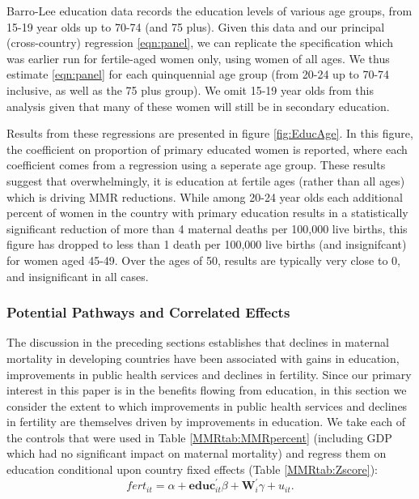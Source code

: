 \documentclass{article}[12pt,subeqn]
\begin{document}
\begin{spacing}{1.4}
Barro-Lee education data records the education levels of various age groups,
from 15-19 year olds up to 70-74 (and 75 plus).  Given this data and our
principal (cross-country) regression \ref{eqn:panel}, we can replicate the
specification which was earlier run for fertile-aged women only, using women of
all ages.  We thus estimate \ref{eqn:panel} for each quinquennial age group
(from 20-24 up to 70-74 inclusive, as well as the 75 plus group).  We omit
15-19 year olds from this analysis given that many of these women will still
be in secondary education.

Results from these regressions are presented in figure \ref{fig:EducAge}. In
this figure, the coefficient on proportion of primary educated women is reported,
where each coefficient comes from a regression using a seperate age group.
These results suggest that overwhelmingly, it is education at fertile ages (rather
than all ages) which is driving MMR reductions.  While among 20-24 year olds
each additional percent of women in the country with primary education results in
a statistically significant reduction of more than 4 maternal deaths per 100,000
live births, this figure has dropped to less than 1 death per
100,000 live births (and insignifcant) for women aged 45-49.  Over the ages
of 50, results are typically very close to 0, and insignificant in all cases.


\subsubsection{Potential Pathways and Correlated Effects}
\label{ssscn:effects}
The discussion in the preceding sections establishes that declines in maternal 
mortality in developing countries have been associated with gains in education, 
improvements in public health services and declines in fertility. Since our 
primary interest in this paper is in the benefits flowing from education, in this 
section we consider the extent to which improvements in public health services and 
declines in fertility are themselves driven by improvements in education. We take 
each of the controls that were used in Table \ref{MMRtab:MMRpercent} (including 
GDP which had no significant impact on maternal mortality) and regress them on 
education conditional upon country fixed effects (Table \ref{MMRtab:Zscore}):
\begin{equation}
\label{eqn:Zscore}
  fert_{it}=\alpha + \mathbf{educ}^\prime_{it}\beta + \mathbf{W}^\prime_i\gamma 
  + u_{it}.
\end{equation}


\end{spacing}
\end{document}
